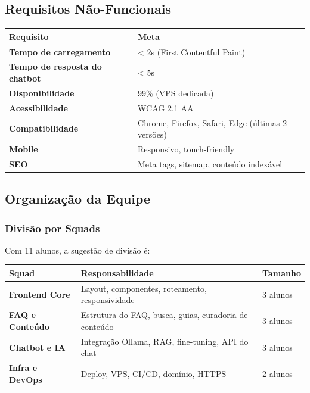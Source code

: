 \documentclass[12pt, a4paper]{article}
\begin{document}
\subsection{Requisitos Não-Funcionais}

\begin{center}
\begin{tabularx}{\textwidth}{>{\bfseries}l X}
  \toprule
  \rowcolor{unbgreen!10}
  Requisito & Meta \\
  \midrule
  Tempo de carregamento & < 2s (First Contentful Paint) \\
  Tempo de resposta do chatbot & < 5s \\
  Disponibilidade & 99\% (VPS dedicada) \\
  Acessibilidade & WCAG 2.1 AA \\
  Compatibilidade & Chrome, Firefox, Safari, Edge (últimas 2 versões) \\
  Mobile & Responsivo, touch-friendly \\
  SEO & Meta tags, sitemap, conteúdo indexável \\
  \bottomrule
\end{tabularx}
\end{center}

\subsection{Organização da Equipe}

\subsubsection{Divisão por Squads}

Com 11 alunos, a sugestão de divisão é:

\begin{center}
\begin{tabularx}{\textwidth}{>{\bfseries}l X l}
  \toprule
  \rowcolor{unbgreen!10}
  Squad & Responsabilidade & Tamanho \\
  \midrule
  Frontend Core & Layout, componentes, roteamento, responsividade & 3 alunos \\
  FAQ e Conteúdo & Estrutura do FAQ, busca, guias, curadoria de conteúdo & 3 alunos \\
  Chatbot e IA & Integração Ollama, RAG, fine-tuning, API do chat & 3 alunos \\
  Infra e DevOps & Deploy, VPS, CI/CD, domínio, HTTPS & 2 alunos \\
  \bottomrule
\end{tabularx}
\end{center}
\end{document}
